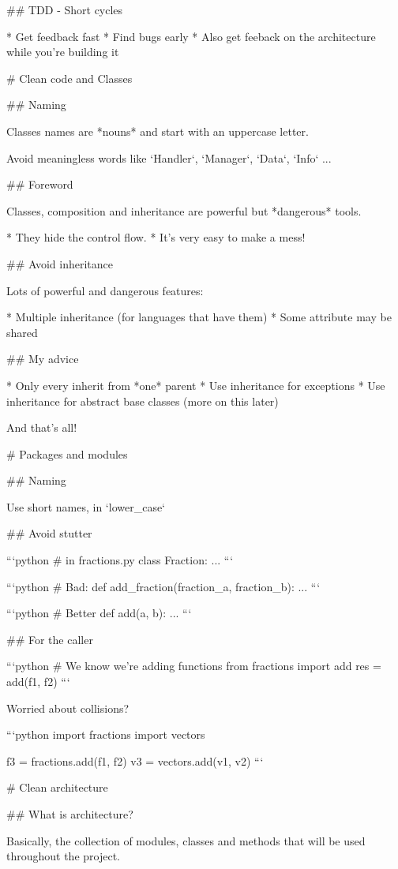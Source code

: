 ## TDD - Short cycles

 * Get feedback fast
 * Find bugs early
 * Also get feeback on the architecture while you're building it

# Clean code and Classes

## Naming

Classes names are *nouns* and start with an uppercase letter.

Avoid meaningless words like `Handler`, `Manager`, `Data`, `Info` ...

## Foreword

Classes, composition and inheritance are powerful but *dangerous* tools.

* They hide the control flow.
* It's very easy to make a mess!

## Avoid inheritance

Lots of powerful and dangerous features:

* Multiple inheritance (for languages that have them)
* Some attribute may be shared

## My advice

* Only every inherit from *one* parent
* Use inheritance for exceptions
* Use inheritance for abstract base classes (more on this later)

And that's all!

# Packages and modules

## Naming

Use short names, in `lower_case`

## Avoid stutter

```python
# in fractions.py
class Fraction:
    ...
```

```python
# Bad:
def add_fraction(fraction_a, fraction_b):
    ...
```

```python
# Better
def add(a, b):
    ...
```

## For the caller

```python
# We know we're adding functions
from fractions import add
res = add(f1, f2)
```

Worried about collisions?

```python
import fractions
import vectors

f3 = fractions.add(f1, f2)
v3 = vectors.add(v1, v2)
```

# Clean architecture

## What is architecture?

Basically, the collection of modules, classes and methods that will
be used throughout the project.

